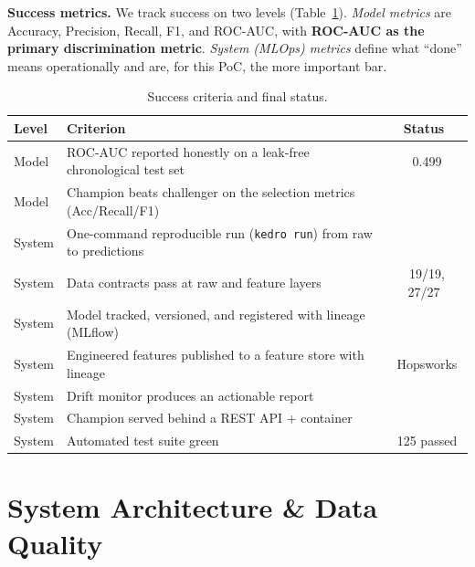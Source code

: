 \documentclass[12pt]{article}
\newcommand{\boldparagraph}[1]{\textbf{#1}\hspace{5pt}}
\newcommand{\cmark}{\textcolor{green!55!black}{\checkmark}}
\begin{document}
\boldparagraph{Success metrics.} We track success on two levels (Table~\ref{tab:success}). \textit{Model metrics} are Accuracy, Precision, Recall, F1, and ROC-AUC, with \textbf{ROC-AUC as the primary discrimination metric}. \textit{System (MLOps) metrics} define what ``done'' means operationally and are, for this PoC, the more important bar.

\vspace{-3pt}
\begin{table}[H]
\centering\small
\caption{Success criteria and final status.}
\label{tab:success}
\begin{tabularx}{\textwidth}{lXc}
\toprule
\textbf{Level} & \textbf{Criterion} & \textbf{Status} \\
\midrule
Model & ROC-AUC reported honestly on a leak-free chronological test set & \cmark\ 0.499 \\
Model & Champion beats challenger on the selection metrics (Acc/Recall/F1) & \cmark \\
System & One-command reproducible run (\texttt{kedro run}) from raw to predictions & \cmark \\
System & Data contracts pass at raw and feature layers & \cmark\ 19/19, 27/27 \\
System & Model tracked, versioned, and registered with lineage (MLflow) & \cmark \\
System & Engineered features published to a feature store with lineage & \cmark\ Hopsworks \\
System & Drift monitor produces an actionable report & \cmark \\
System & Champion served behind a REST API + container & \cmark \\
System & Automated test suite green & \cmark\ 125 passed \\
\bottomrule
\end{tabularx}
\end{table}

\section{System Architecture \& Data Quality}
\end{document}

